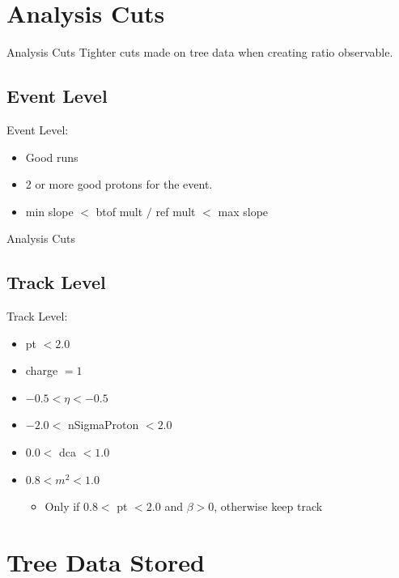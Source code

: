 \documentclass{beamer}
\begin{document}
\section{Analysis Cuts}

\begin{frame}{Analysis Cuts}
Tighter cuts made on tree data when creating ratio observable.
\newline \newline \newline
\subsection{Event Level}
Event Level:
	\begin{itemize}
		\item Good runs
		\item 2 or more good protons for the event.
		\item min slope $<$ btof mult $/$ ref mult $<$ max slope
	\end{itemize}
\end{frame}

\begin{frame}{Analysis Cuts}
\subsection{Track Level}
Track Level:
    \begin{itemize}
        \item pt $< 2.0$
        \item charge $ = 1$
        \item $-0.5 < \eta < -0.5$
        \item $-2.0 < $ nSigmaProton $ < 2.0$
        \item $0.0 <$ dca $< 1.0$
        \item $0.8 < m^2 < 1.0$
            \begin{itemize}
                \item Only if $0.8 <$ pt $< 2.0$ and $\beta > 0$, otherwise keep track
            \end{itemize}
    \end{itemize}
    
\end{frame}

\section{Tree Data Stored}
\end{document}
